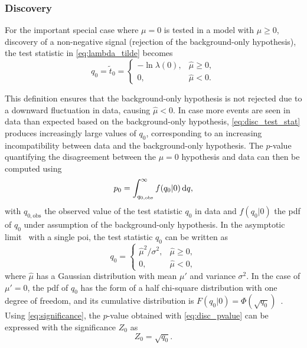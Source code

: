 \subsubsection{Discovery}
For the important special case where $\mu = 0$ is tested in a model with $\mu \geq 0$, \ie discovery of a non-negative signal (rejection of the background-only hypothesis), the test statistic in \cref{eq:lambda_tilde} becomes
\begin{equation}
	q_0 = \tilde{t}_0 = 
\begin{cases}
    -\ln{\lambda(0)}, & \hat{\mu} \geq 0,\\
    0,              & \hat{\mu} < 0.
\end{cases}
\label{eq:disc_test_stat}
\end{equation}

This definition ensures that the background-only hypothesis is not rejected due to a downward fluctuation in data, causing $\hat{\mu} < 0$. In case more events are seen in data than expected based on the background-only hypothesis, \cref{eq:disc_test_stat} produces increasingly large values of $q_0$, corresponding to an increasing incompatibility between data and the background-only hypothesis. The $p$-value quantifying the disagreement between the $\mu = 0$ hypothesis and data can then be computed using
\begin{equation}
		p_0 = \int_{q_{0,\mathrm{obs}}}^{\infty}{f(q_0\vert 0)\mathop{}\!\mathrm{d} q},
		\label{eq:disc_pvalue}
\end{equation}
with $q_{0,\mathrm{obs}}$ the observed value of the test statistic $q_0$ in data and $f(q_0\vert 0)$ the \gls{pdf} of $q_0$ under assumption of the background-only hypothesis. In the asymptotic limit~\cite{Cowan:2010js} with a single \gls{poi}, the test statistic $q_0$ can be  written as
\begin{equation}
	q_0 = \begin{cases}
    \hat{\mu}^2/\sigma^2, & \hat{\mu} \geq 0,\\
    0,              & \hat{\mu} < 0,
\end{cases}
\label{eq:test_stat_disc_asymptotic}
\end{equation}
where $\hat{\mu}$ has a Gaussian distribution with mean $\mu '$ and variance $\sigma^2$. In the case of $\mu'=0$, the \gls{pdf} of $q_0$ has the form of a half chi-square distribution with one degree of freedom, and its cumulative distribution is $F(q_0 \vert 0) = \Phi(\sqrt{q_0})$~\cite{Cranmer:2015nia}. Using \cref{eq:significance}, the $p$-value obtained with \cref{eq:disc_pvalue} can be expressed with the significance $Z_0$ as
\begin{equation}
	Z_0 = \sqrt{q_0}.
\end{equation}


